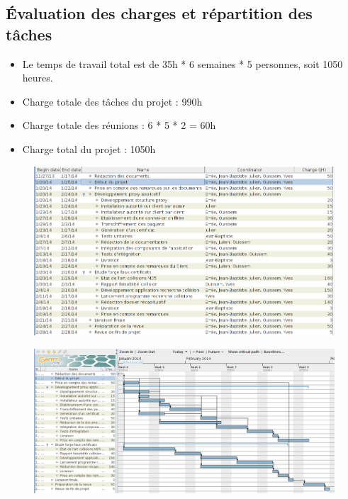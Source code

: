 \documentclass[a4paper,11pt,french]{article}
\begin{document}
\subsection{Évaluation des charges et répartition des tâches}

\begin{itemize}
\item Le temps de travail total est de 35h * 6 semaines * 5 personnes, soit 1050 heures.
\item Charge totale des tâches du projet : 990h
\item Charge totale des réunions : 6 * 5 * 2 = 60h
\item Charge total du projet : 1050h
\end{itemize}

\newpage
\begin{figure}[h!]
\includegraphics[width=\textwidth]{images/taches.png}
\end{figure}

\newpage
\begin{figure}[h!]
\includegraphics[width=0.9\textheight, angle=90]{images/planification.png}
\end{figure}
\end{document}
